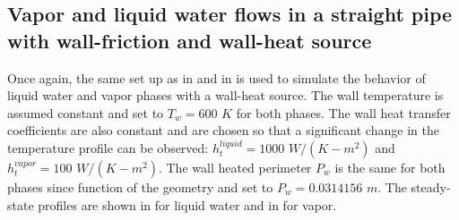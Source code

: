 \subsection{Vapor and liquid water flows in a straight pipe with wall-friction and wall-heat source} \label{sec:1d-wall-heat-source}
Once again, the same set up as in  and in  is used to simulate the behavior of liquid water and vapor phases with a wall-heat source. The wall temperature is assumed constant and set to $T_w=600$ $K$ for both phases. The wall heat transfer coefficients are also constant and are chosen so that a significant change in the temperature profile can be observed: $h_t^{liquid} = 1000$ $W/(K-m^2)$ and $h_t^{vapor} = 100$ $W/(K-m^2)$. The wall heated perimeter $P_w$ is the same for both phases since function of the geometry and set to $P_w = 0.0314156$ $m$. The steady-state profiles are shown in  for liquid water and in  for vapor. 
%
